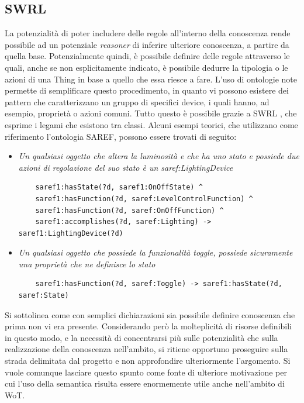 \documentclass[12pt,a4paper,openright,oneside]{report}
\begin{document}
\subsection{SWRL}
La potenzialità di poter includere delle regole all'interno della conoscenza rende possibile ad un potenziale \textit{reasoner} di inferire ulteriore conoscenza, a partire da quella base. Potenzialmente quindi, è possibile definire delle regole attraverso le quali, anche se non esplicitamente indicato, è possibile dedurre la tipologia o le azioni di una Thing in base a quello che essa riesce a fare. L'uso di ontologie note permette di semplificare questo procedimento, in quanto vi possono esistere dei pattern che caratterizzano un gruppo di specifici device, i quali hanno, ad esempio, proprietà o azioni comuni. Tutto questo è possibile grazie a SWRL \cite{swrl}, che esprime i legami che esistono tra classi. Alcuni esempi teorici, che utilizzano come riferimento l'ontologia SAREF, possono essere trovati di seguito:

\clearpage

\begin{itemize}
	\item {\textit{Un qualsiasi oggetto che altera la luminosità e che ha uno stato e possiede due azioni di regolazione del suo stato è un \textit{saref:LightingDevice}}}
	\begin{lstlisting}
	saref1:hasState(?d, saref1:OnOffState) ^ 
	saref1:hasFunction(?d, saref:LevelControlFunction) ^ 
	saref1:hasFunction(?d, saref:OnOffFunction) ^
	saref1:accomplishes(?d, saref:Lighting) -> saref1:LightingDevice(?d)
	\end{lstlisting}

	\item {\textit{Un qualsiasi oggetto che possiede la funzionalità \textit{toggle}, possiede sicuramente una proprietà che ne definisce lo stato}}
	\begin{lstlisting}
	saref1:hasFunction(?d, saref:Toggle) -> saref1:hasState(?d, saref:State)
	\end{lstlisting}
\end{itemize}

Si sottolinea come con semplici dichiarazioni sia possibile definire conoscenza che prima non vi era presente. Considerando però la molteplicità di risorse definibili in questo modo, e la necessità di concentrarsi più sulle potenzialità che sulla realizzazione della conoscenza nell'ambito, si ritiene opportuno proseguire sulla strada delimitata dal progetto e non approfondire ulteriormente l'argomento. Si vuole comunque lasciare questo spunto come fonte di ulteriore motivazione per cui l'uso della semantica risulta essere enormemente utile anche nell'ambito di WoT.
\end{document}
